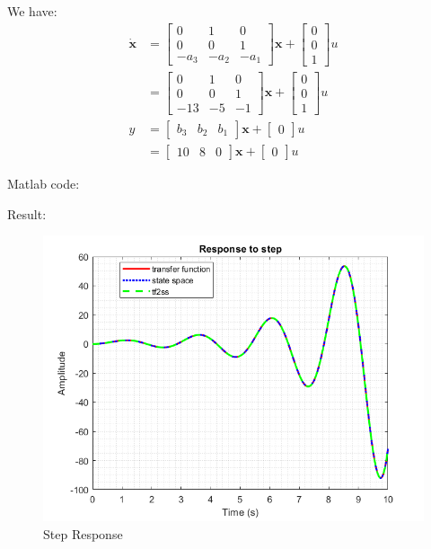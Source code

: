 We have:
\begin{equation}
    \begin{aligned}
        \dot{\textbf{x}} &=
        \begin{bmatrix}
            0    & 1    & 0\\
            0    & 0    & 1\\
            -a_3 & -a_2 & -a_1
        \end{bmatrix}
        \textbf{x} + 
        \begin{bmatrix}
            0 \\ 0 \\ 1
        \end{bmatrix}
        u \\ &=
        \begin{bmatrix}
            0    & 1    & 0\\
            0    & 0    & 1\\
            -13  & -5   & -1
        \end{bmatrix}
        \textbf{x} + 
        \begin{bmatrix}
            0 \\ 0 \\ 1
        \end{bmatrix}
        u \\
        y &=
        \begin{bmatrix}
            b_3 & b_2 & b_1
        \end{bmatrix}
        \textbf{x} + 
        \begin{bmatrix}
            0
        \end{bmatrix}
        u \\ &=
        \begin{bmatrix}
            10 & 8 & 0
        \end{bmatrix}
        \textbf{x} + 
        \begin{bmatrix}
            0
        \end{bmatrix}
        u
    \end{aligned}
\end{equation}

Matlab code:
    
Result:
\begin{figure}[htp]
    \centering
    \includegraphics[width=12cm]{images/Q5_b_fig.png}
    \caption{Step Response}
    \label{fig:Q5a1}
\end{figure}
\pagebreak
